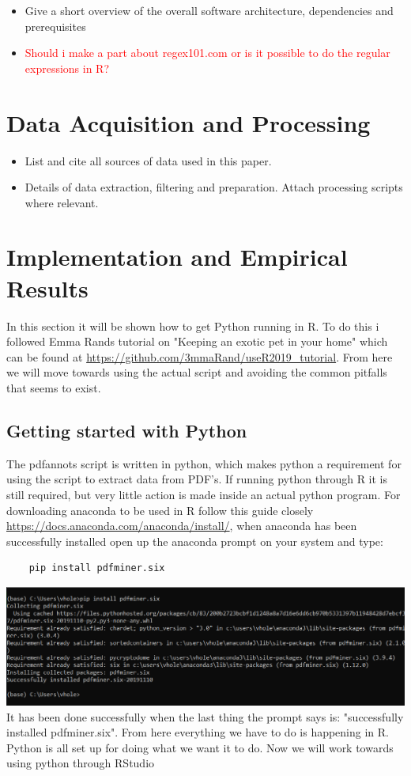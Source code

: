 \documentclass{article}
\begin{document}
\begin{itemize}
    \item Give a short overview of the overall software architecture, dependencies and prerequisites
    \item \textcolor{red}{Should i make a part about regex101.com or is it possible to do the regular expressions in R?}
\end{itemize}{}

\section{Data Acquisition and Processing}
\begin{itemize}
\item List and cite all sources of data used in this paper.
\item Details of data extraction, filtering and preparation. Attach processing scripts where relevant.
\end{itemize}{}

\section{Implementation and Empirical Results}
In this section it will be shown how to get Python running in R. To do this i followed Emma Rands tutorial on "Keeping an exotic pet in your home" which can be found at \url{https://github.com/3mmaRand/useR2019_tutorial}. From here we will move towards using the actual script and avoiding the common pitfalls that seems to exist.  
\subsection{Getting started with Python}
The pdfannots script is written in python, which makes python a requirement for using the script to extract data from PDF’s. If running python through R it is still required, but very little action is made inside an actual python program. For downloading anaconda to be used in R follow this guide closely \url{https://docs.anaconda.com/anaconda/install/}, when anaconda has been successfully installed open up the anaconda prompt on your system and type: 
\begin{verbatim}
    pip install pdfminer.six
\end{verbatim}
\includegraphics[scale=0.53]{Install_pdfminer_six.PNG}\newline
It has been done successfully when the last thing the prompt says is: "successfully installed pdfminer.six". From here everything we have to do is happening in R. Python is all set up for doing what we want it to do. Now we will work towards using python through RStudio
\end{document}
